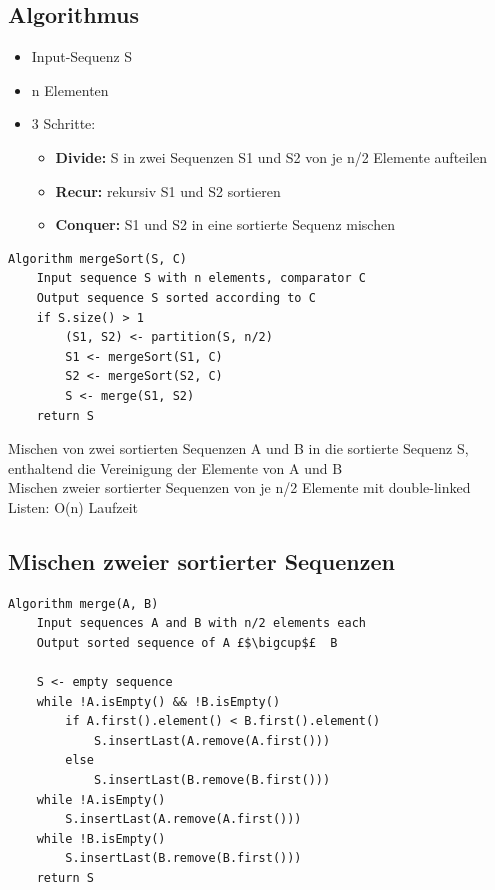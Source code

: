 \subsection{Algorithmus}
\begin{itemize}
    \item Input-Sequenz S
    \item n Elementen
    \item 3 Schritte:
    \begin{itemize}
        \item \textbf{Divide:} S in zwei Sequenzen S1 und S2 von je n/2 Elemente aufteilen
        \item \textbf{Recur:} rekursiv S1 und S2 sortieren
        \item \textbf{Conquer:} S1 und S2 in eine sortierte Sequenz mischen
    \end{itemize}
\end{itemize}
\begin{lstlisting}
Algorithm mergeSort(S, C)
    Input sequence S with n elements, comparator C
    Output sequence S sorted according to C
    if S.size() > 1
        (S1, S2) <- partition(S, n/2)
        S1 <- mergeSort(S1, C)
        S2 <- mergeSort(S2, C)
        S <- merge(S1, S2)
    return S
\end{lstlisting}
Mischen von zwei sortierten Sequenzen A und B in die sortierte Sequenz S, enthaltend die Vereinigung der Elemente von A und B\\
Mischen zweier sortierter Sequenzen von je n/2 Elemente mit double-linked Listen: O(n) Laufzeit \\
\subsection{Mischen zweier sortierter Sequenzen}

\begin{lstlisting}
Algorithm merge(A, B)
    Input sequences A and B with n/2 elements each
    Output sorted sequence of A £$\bigcup$£  B

    S <- empty sequence
    while !A.isEmpty() && !B.isEmpty()
        if A.first().element() < B.first().element()
            S.insertLast(A.remove(A.first()))
        else
            S.insertLast(B.remove(B.first()))
    while !A.isEmpty()
        S.insertLast(A.remove(A.first()))
    while !B.isEmpty()
        S.insertLast(B.remove(B.first()))
    return S
\end{lstlisting}

